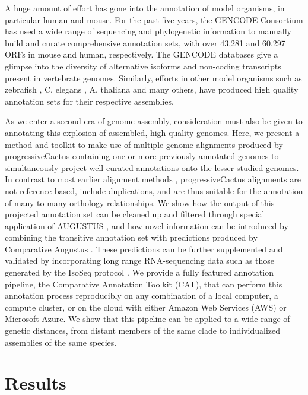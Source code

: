 \documentclass[fleqn,10pt]{wlscirep}
\begin{document}
A huge amount of effort has gone into the annotation of model organisms, in particular human and mouse. For the past five years, the GENCODE Consortium \cite{harrow2012gencode} has used a wide range of sequencing and phylogenetic information to manually build and curate comprehensive annotation sets, with over 43,281 and 60,297 ORFs in mouse and human, respectively. The GENCODE databases give a glimpse into the diversity of alternative isoforms and non-coding transcripts present in vertebrate genomes. Similarly, efforts in other model organisms such as zebrafish \cite{westerfield1998zebrafish}, C. elegans \cite{stein2001wormbase}, A. thaliana \cite{swarbreck2008arabidopsis} and many others, have produced high quality annotation sets for their respective assemblies.

As we enter a second era of genome assembly, consideration must also be given to annotating this explosion of assembled, high-quality genomes. Here, we present a method and toolkit to make use of multiple genome alignments produced by progressiveCactus \cite{paten2011cactus} containing one or more previously annotated genomes to simultaneously project well curated annotations onto the lesser studied genomes. In contrast to most earlier alignment methods \cite{blanchette2004aligning,earl2014alignathon,miller200728}, progressiveCactus alignments are not-reference based, include duplications, and are thus suitable for the annotation of many-to-many orthology relationships. We show how the output of this projected annotation set can be cleaned up and filtered through special application of AUGUSTUS \cite{stanke2008using}, and how novel information can be introduced by combining the transitive annotation set with predictions produced by Comparative Augustus \cite{konig2015simultaneous}. These predictions can be further supplemented and validated by incorporating long range RNA-sequencing data such as those generated by the IsoSeq protocol \cite{gordon2015widespread}. We provide a fully featured annotation pipeline, the Comparative Annotation Toolkit (CAT), that can perform this annotation process reproducibly on any combination of a local computer, a compute cluster, or on the cloud with either Amazon Web Services (AWS) or Microsoft Azure. We show that this pipeline can be applied to a wide range of genetic distances, from distant members of the same clade to individualized assemblies of the same species.


\section{Results}
\end{document}
